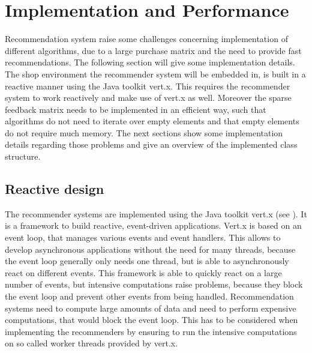 \documentclass[10pt]{reportMaster}
\begin{document}
\chapter{Implementation and Performance}
\label{chap:ImplemenationAndPerformance}
Recommendation system raise some challenges concerning implementation of different algorithms, due to a large purchase matrix and the need to provide fast recommendations.
The following section will give some implementation details. 
The shop environment the recommender system will be embedded in, is built in a reactive manner using the Java toolkit vert.x.
This requires the recommender system to work reactively and make use of vert.x as well.
Moreover the sparse feedback matrix needs to be implemented in an efficient way, such that algorithms do not need to iterate over empty elements and that empty elements do not require much memory.
The next sections show some implementation details regarding those problems and give an overview of the implemented class structure.

\section{Reactive design}
\label{sec:ReactiveDesign}
The recommender systems are implemented using the Java toolkit vert.x (see \cite{vertx}).
It is a framework to build reactive, event-driven applications.
Vert.x is based on an event loop, that manages various events and event handlers.
This allows to develop asynchronous applications without the need for many threads, because the event loop generally only needs one thread, but is able to asynchronously react on different events.
This framework is able to quickly react on a large number of events, but intensive computations raise problems, because they block the event loop and prevent other events from being handled.
Recommendation systems need to compute large amounts of data and need to perform expensive computations, that would block the event loop.
This has to be considered when implementing the recommenders by ensuring to run the intensive computations on so called worker threads provided by vert.x.
\end{document}
